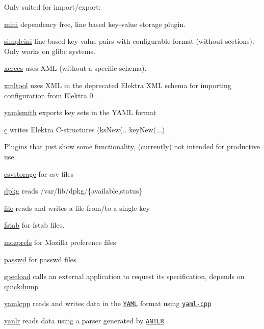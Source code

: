 Only suited for import/export\+:


\begin{DoxyItemize}
\item \hyperlink{autotoc_md371_src_plugins_mini_README_md}{mini} dependency free, line based key-\/value storage plugin.
\item \hyperlink{autotoc_md599_src_plugins_simpleini_README_md}{simpleini} line-\/based key-\/value pairs with configurable format (without sections). Only works on glibc systems.
\item \hyperlink{autotoc_md767_src_plugins_xerces_README_md}{xerces} uses X\+ML (without a specific schema).
\item \hyperlink{autotoc_md773_src_plugins_xmltool_README_md}{xmltool} uses X\+ML in the deprecated Elektra X\+ML schema for importing configuration from Elektra 0..
\item \hyperlink{autotoc_md889_src_plugins_yamlsmith_README_md}{yamlsmith} exports key sets in the Y\+A\+ML format
\item \hyperlink{autotoc_md69_src_plugins_c_README_md}{c} writes Elektra C-\/structures ({\ttfamily ks\+New(.. key\+New(...})
\end{DoxyItemize}

Plugins that just show some functionality, (currently) not intended for productive use\+:


\begin{DoxyItemize}
\item \hyperlink{autotoc_md122_src_plugins_csvstorage_README_md}{csvstorage} for csv files
\item \hyperlink{autotoc_md190_src_plugins_dpkg_README_md}{dpkg} reads /var/lib/dpkg/\{available,status\}
\item \hyperlink{autotoc_md214_src_plugins_file_README_md}{file} reads and writes a file from/to a single key
\item \hyperlink{autotoc_md228_src_plugins_fstab_README_md}{fstab} for fstab files.
\item \hyperlink{autotoc_md441_src_plugins_mozprefs_README_md}{mozprefs} for Mozilla preference files
\item \hyperlink{autotoc_md480_src_plugins_passwd_README_md}{passwd} for passwd files
\item \hyperlink{autotoc_md618_src_plugins_specload_README_md}{specload} calls an external application to request its specification, depends on \hyperlink{autotoc_md526_src_plugins_quickdump_README_md}{quickdump}
\item \hyperlink{autotoc_md807_src_plugins_yamlcpp_README_md}{yamlcpp} reads and writes data in the \href{http://www.yaml.org}{\tt Y\+A\+ML} format using \href{https://github.com/jbeder/yaml-cpp}{\tt yaml-\/cpp}
\item \hyperlink{autotoc_md897_src_plugins_yanlr_README_md}{yanlr} reads data using a parser generated by \href{http://www.antlr.org}{\tt A\+N\+T\+LR}
\end{DoxyItemize}

